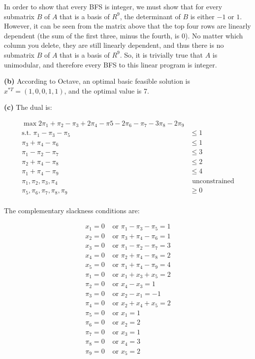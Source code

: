 \documentclass[fleqn]{homework}
\begin{document}
\begin{problem}{5}
    In order to show that every BFS is integer, we must show that for every
    submatrix $B$ of $A$ that is a basis of $R^9$, the determinant of $B$ is
    either $-1$ or $1$.  However, it can be seen from the matrix above that the
    top four rows are linearly dependent (the sum of the first three, minus the
    fourth, is 0).  No matter which column you delete, they are still linearly
    dependent, and thus there is no submatrix $B$ of $A$ that is a basis of
    $R^9$.  So, it is trivially true that $A$ is unimodular, and therefore every
    BFS to this linear program is integer.

    \textbf{(b)} According to Octave, an optimal basic feasible solution is
    $x^{*T} = (1, 0, 0, 1, 1)$, and the optimal value is 7.

    \textbf{(c)} The dual is:

    \begin{align*}
      \max 2\pi_1 + \pi_2 - \pi_3 + 2\pi_4 - \pi5 - 2\pi_6 - \pi_7 - 3\pi_8 - 2\pi_9 &\\
      \text{s.t. } \pi_1 - \pi_3 - \pi_5 &\le 1 \\
      \pi_3 + \pi_4 - \pi_6 &\le 1 \\
      \pi_1 - \pi_2 - \pi_7 &\le 3 \\
      \pi_2 + \pi_4 - \pi_8 &\le 2 \\
      \pi_1 + \pi_4 - \pi_9 &\le 4 \\
      \pi_1, \pi_2, \pi_3, \pi_4 &\text{ unconstrained}\\
      \pi_5, \pi_6, \pi_7, \pi_8, \pi_9 &\ge 0 \\
    \end{align*}

    The complementary slackness conditions are:

    \begin{align*}
      x_1 = 0 & \text{ or } \pi_1 - \pi_3 - \pi_5 = 1 \\
      x_2 = 0 & \text{ or } \pi_3 + \pi_4 - \pi_6 = 1 \\
      x_3 = 0 & \text{ or } \pi_1 - \pi_2 - \pi_7 = 3 \\
      x_4 = 0 & \text{ or } \pi_2 + \pi_4 - \pi_8 = 2 \\
      x_5 = 0 & \text{ or } \pi_1 + \pi_4 - \pi_9 = 4 \\
      \pi_1 = 0 & \text{ or } x_1 + x_3 + x_5 = 2 \\
      \pi_2 = 0 & \text{ or } x_4 - x_3 = 1 \\
      \pi_3 = 0 & \text{ or } x_2 - x_1 = -1 \\
      \pi_4 = 0 & \text{ or } x_2 + x_4 + x_5 = 2 \\
      \pi_5 = 0 & \text{ or } x_1 = 1 \\
      \pi_6 = 0 & \text{ or } x_2 = 2 \\
      \pi_7 = 0 & \text{ or } x_3 = 1 \\
      \pi_8 = 0 & \text{ or } x_4 = 3 \\
      \pi_9 = 0 & \text{ or } x_5 = 2 \\
    \end{align*}


\end{problem}
\end{document}
